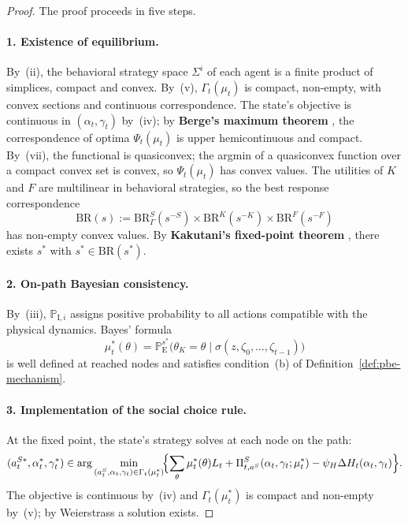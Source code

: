 \documentclass[ecta,nameyear,final,supplement]{econsocart}
\numberwithin{equation}{section}
\numberwithin{table}{section}
\theoremstyle{definition}
\newcommand{\ProbE}{\mathbb{P}_{\mathrm{E}}}
\newcommand{\ProbI}[1]{\mathbb{P}_{\mathrm{I},#1}}
\begin{document}
\begin{proof}
The proof proceeds in five steps.

\paragraph{1. Existence of equilibrium.}
By~(ii), the behavioral strategy space $\Sigma^i$ of each agent is a finite
product of simplices, compact and convex. By~(v),
$\Gamma_t(\mu_t)$ is compact, non-empty, with convex sections and continuous
correspondence. The state's objective is continuous in $(\alpha_t,\gamma_t)$
by~(iv); by \textbf{Berge's maximum theorem} \citep{AliprantisBorder2006}, the
correspondence of optima $\Psi_t(\mu_t)$ is upper hemicontinuous and compact.
By~(vii), the functional is quasiconvex; the argmin of a quasiconvex function
over a compact convex set is convex, so $\Psi_t(\mu_t)$ has convex values. The
utilities of $K$ and $F$ are multilinear in behavioral strategies, so the best
response correspondence
\[
\mathrm{BR}(s)
:=\mathrm{BR}^S_\Gamma(s^{-S})\times\mathrm{BR}^K(s^{-K})
  \times\mathrm{BR}^F(s^{-F})
\]
has non-empty convex values. By \textbf{Kakutani's fixed-point theorem}
\citep{Kakutani1941}, there exists $s^\ast$ with
$s^\ast\in\mathrm{BR}(s^\ast)$.

\paragraph{2. On-path Bayesian consistency.}
By~(iii), $\ProbI{i}$ assigns positive probability to all actions compatible
with the physical dynamics. Bayes' formula
\[
\mu_t^\ast(\theta)
=\ProbE^{s^\ast}\!\bigl(\theta_K=\theta\mid\sigma(z,\zeta_0,\ldots,\zeta_{t-1})\bigr)
\]
is well defined at reached nodes and satisfies condition~(b) of
Definition~\ref{def:pbe-mechanism}.

\paragraph{3. Implementation of the social choice rule.}
At the fixed point, the state's strategy solves at each node on the path:
\[
(a_t^{S\ast},\alpha_t^\ast,\gamma_t^\ast)
\in\arg\min_{(a_t^S,\alpha_t,\gamma_t)\in\Gamma_t(\mu_t^\ast)}
\!\Bigl\{\sum_\theta\mu_t^\ast(\theta)L_t
+\Pi_{t,a^S}^S(\alpha_t,\gamma_t;\mu_t^\ast)
-\psi_H\Delta H_t(\alpha_t,\gamma_t)\Bigr\}.
\]
The objective is continuous by~(iv) and $\Gamma_t(\mu_t^\ast)$ is compact and
non-empty by~(v); by Weierstrass a solution exists.


\end{proof}
\end{document}
